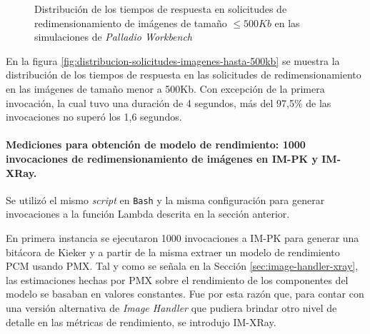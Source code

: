 \begin{figure}[h]
\hspace{-1.0cm}
\caption{Distribución de los tiempos de respuesta en solicitudes de redimensionamiento de imágenes de tamaño $\leq 500Kb$ en las simulaciones de \emph{Palladio Workbench}}
\label{fig:distribucion-simulacion-imagenes-hasta-500kb}
\end{figure}

En la figura \ref{fig:distribucion-solicitudes-imagenes-hasta-500kb} se muestra la distribución de los tiempos de respuesta en las solicitudes de redimensionamiento en las imágenes de tamaño menor a 500Kb. Con excepción de la primera invocación, la cual tuvo una duración de 4 segundos, más del 97,5\% de las invocaciones no superó los 1,6 segundos.

\paragraph{Mediciones para obtención de modelo de rendimiento: 1000 invocaciones de redimensionamiento de imágenes en IM-PK y IM-XRay.} Se utilizó el mismo \emph{script} en \texttt{Bash} y la misma configuración para generar invocaciones a la función Lambda descrita en la sección anterior.

En primera instancia se ejecutaron 1000 invocaciones a IM-PK para generar una bitácora de Kieker y a partir de la misma extraer un modelo de rendimiento PCM usando PMX. Tal y como se señala en la Sección \ref{sec:image-handler-xray}, las estimaciones hechas por PMX sobre el rendimiento de los componentes del modelo se basaban en valores constantes. Fue por esta razón que, para contar con una versión alternativa de \emph{Image Handler} que pudiera brindar otro nivel de detalle en las  métricas de rendimiento, se introdujo IM-XRay.

